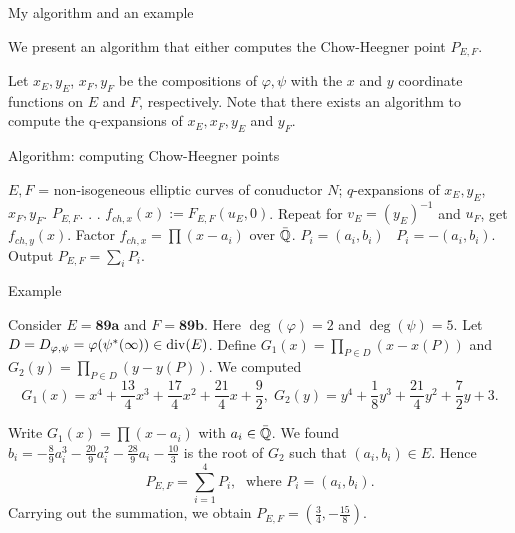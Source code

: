 \documentclass[handout]{beamer}
\begin{document}
\begin{frame}{My algorithm and an example}

We present an algorithm that either computes the Chow-Heegner point $P_{E,F}$. 

 Let $x_E, y_E$, $x_F,y_F$ be the compositions of $\varphi, \psi$ with the $x$ and $y$ coordinate functions on $E$ and $F$, respectively. Note that there exists an algorithm to compute the q-expansions of $x_E,x_F,y_E$ and $y_F$.  

\end{frame}

\begin{frame}{Algorithm: computing Chow-Heegner points}
\begin{algorithm}[H]
\begin{algorithmic}              %
    \Require  $E, F$  = non-isogeneous elliptic curves of conuductor $N$;
    $q$-expansions of $x_E, y_E$, $x_F,y_F$.
    \Ensure $P_{E,F}$.
        .
    .
    \State $f_{ch,x}(x) := F_{E,F}(u_E,0)$.
    \State Repeat for $v_E = (y_E)^{-1}$ and $u_F$, get $f_{ch,y}(x)$.
    \State Factor $f_{ch,x} = \prod (x-a_i)$ over $\bar{\mathbb{Q}}$.
      $P_i = (a_i,b_i)$ \Else  \,  $P_i = - (a_i, b_i)$.
    \EndIf
    \EndFor
\State Output $P_{E,F} = \sum_i P_i$.
\end{algorithmic}
\end{algorithm}
\end{frame}

\begin{frame}{Example}

\begin{Example}
Consider $E = \textbf{89a}$ and $F = \textbf{89b}$. Here $\deg(\varphi) = 2$ and $\deg(\psi) = 5$. Let 
$D = D_{\varphi, \psi}= \varphi(\psi^*(\infty)) \in \operatorname{div}(E)$. Define $G_1(x) = \prod_{P \in D} (x - x(P))$ 
and $G_2(y) = \prod_{P \in D} (y - y(P))$. We computed 
\[
G_1(x) = x^{4} + \frac{13}{4} x^{3} + \frac{17}{4} x^{2} + \frac{21}{4} x + \frac{9}{2}, \; G_2(y) = y^{4} + \frac{1}{8} y^{3} + \frac{21}{4} y^{2} + \frac{7}{2} y + 3.
\]

Write $G_1(x) = \prod (x-a_i)$ with $a_i \in \bar{\mathbb{Q}}$. We found  $b_i = -\frac{8}{9} a_i^{3} - \frac{20}{9} a_i^{2} - \frac{28}{9} a_i - \frac{10}{3}$ is the root of $G_2$ such that $(a_i,b_i) \in E$. Hence 
	$$P_{E,F} = \sum_{i=1}^4 P_i, \; \mbox{ where } P_i = (a_i, b_i).$$
Carrying out the summation, we obtain $P_{E,F} = (\frac{3}{4},-\frac{15}{8})$. 

\end{Example}


\end{frame}
\end{document}
